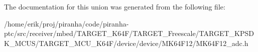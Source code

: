 The documentation for this union was generated from the following file\+:\begin{DoxyCompactItemize}
\item 
/home/erik/proj/piranha/code/piranha-\/ptc/src/receiver/mbed/\+T\+A\+R\+G\+E\+T\+\_\+\+K64\+F/\+T\+A\+R\+G\+E\+T\+\_\+\+Freescale/\+T\+A\+R\+G\+E\+T\+\_\+\+K\+P\+S\+D\+K\+\_\+\+M\+C\+U\+S/\+T\+A\+R\+G\+E\+T\+\_\+\+M\+C\+U\+\_\+\+K64\+F/device/device/\+M\+K64\+F12/M\+K64\+F12\+\_\+adc.\+h\end{DoxyCompactItemize}
